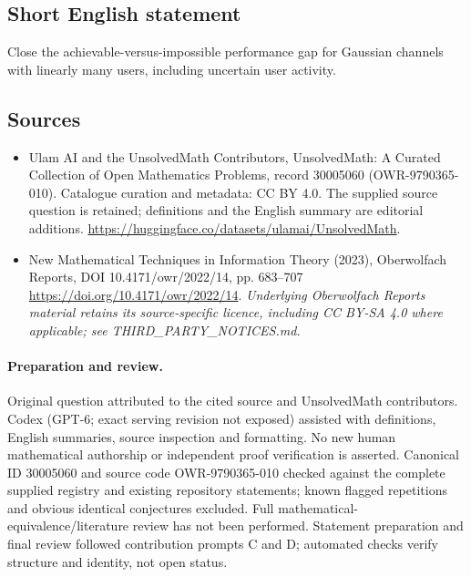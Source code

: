 \documentclass[11pt]{article}
\begin{document}
\subsection{Short English statement}
Close the achievable-versus-impossible performance gap for Gaussian channels with linearly many users, including uncertain user activity.
\subsection{Sources}
\begin{itemize}
\item[\hypertarget{source:30005060:1}{S1}] Ulam AI and the UnsolvedMath Contributors, UnsolvedMath: A Curated Collection of Open Mathematics Problems, record 30005060 (OWR-9790365-010). Catalogue curation and metadata: CC BY 4.0. The supplied source question is retained; definitions and the English summary are editorial additions.
\url{https://huggingface.co/datasets/ulamai/UnsolvedMath}.
\item[\hypertarget{source:30005060:2}{S2}] New Mathematical Techniques in Information Theory (2023), Oberwolfach Reports, DOI 10.4171/owr/2022/14, pp. 683--707
\url{https://doi.org/10.4171/owr/2022/14}.
\textit{Underlying Oberwolfach Reports material retains its source-specific licence, including CC BY-SA 4.0 where applicable; see THIRD\_PARTY\_NOTICES.md.}
\end{itemize}
\paragraph{Preparation and review.}
Original question attributed to the cited source and UnsolvedMath contributors. Codex (GPT-6; exact serving revision not exposed) assisted with definitions, English summaries, source inspection and formatting. No new human mathematical authorship or independent proof verification is asserted. Canonical ID 30005060 and source code OWR-9790365-010 checked against the complete supplied registry and existing repository statements; known flagged repetitions and obvious identical conjectures excluded. Full mathematical-equivalence/literature review has not been performed. Statement preparation and final review followed contribution prompts C and D; automated checks verify structure and identity, not open status.
\label{end:30005060}
\end{document}

